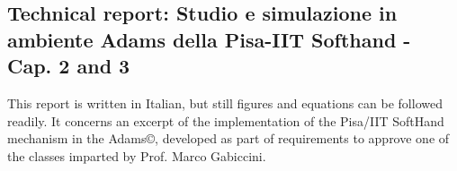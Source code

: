 \documentclass[a4paper,11pt,pdf]{pacmanreport}
\begin{document}







\subsection{Technical report: Studio e simulazione in ambiente Adams della Pisa-IIT Softhand - Cap. 2 and 3 } \label{sec:AdamsSoftHand}
This report is written in Italian, but still figures and equations can be followed readily. It concerns an excerpt of the implementation of the Pisa/IIT SoftHand mechanism in the Adams\copyright, developed as part of requirements to approve one of the classes imparted by Prof. Marco Gabiccini.

\end{document}
